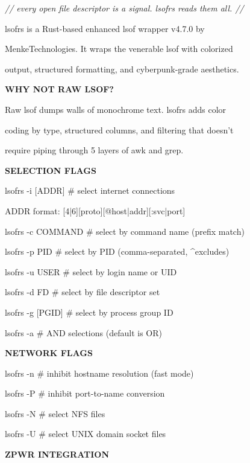 \documentclass[11pt,a4paper,twoside]{book}
\begin{document}
{\small\itshape\color{dimtext} // every open file descriptor is a signal. lsofrs reads them all. //}

lsofrs is a Rust-based enhanced lsof wrapper v4.7.0 by

MenkeTechnologies. It wraps the venerable lsof with colorized

output, structured formatting, and cyberpunk-grade aesthetics.


\vspace{12pt}
{\bfseries\color{neonyellow} WHY NOT RAW LSOF?}\vspace{4pt}

Raw lsof dumps walls of monochrome text. lsofrs adds color

coding by type, structured columns, and filtering that doesn't

require piping through 5 layers of awk and grep.


\vspace{12pt}
{\bfseries\color{neonyellow} SELECTION FLAGS}\vspace{4pt}

lsofrs -i [ADDR]   \# select internet connections

ADDR format: [4|6][proto][@host|addr][:svc|port]

lsofrs -c COMMAND   \# select by command name (prefix match)

lsofrs -p PID       \# select by PID (comma-separated, \textasciicircum{}excludes)

lsofrs -u USER      \# select by login name or UID

lsofrs -d FD        \# select by file descriptor set

lsofrs -g [PGID]    \# select by process group ID

lsofrs -a           \# AND selections (default is OR)


\vspace{12pt}
{\bfseries\color{neonyellow} NETWORK FLAGS}\vspace{4pt}

lsofrs -n           \# inhibit hostname resolution (fast mode)

lsofrs -P           \# inhibit port-to-name conversion

lsofrs -N           \# select NFS files

lsofrs -U           \# select UNIX domain socket files


\vspace{12pt}
{\bfseries\color{neonyellow} ZPWR INTEGRATION}\vspace{4pt}
\end{document}
